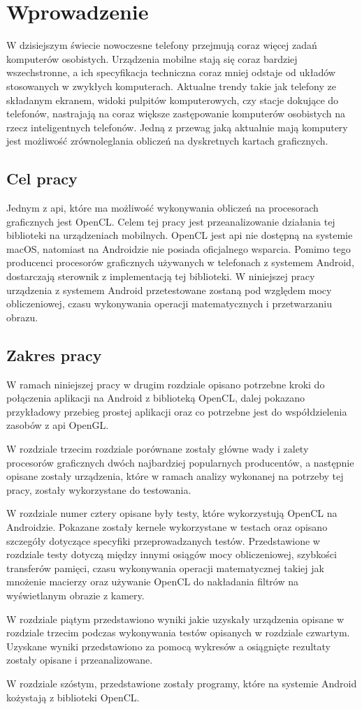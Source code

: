 \section{Wprowadzenie}
W dzisiejszym świecie nowoczesne telefony przejmują coraz więcej zadań komputerów osobistych. Urządzenia mobilne stają się coraz bardziej wszechstronne, a ich specyfikacja techniczna coraz mniej odstaje od układów stosowanych w zwykłych komputerach. Aktualne trendy takie jak telefony ze składanym ekranem, widoki pulpitów komputerowych, czy stacje dokujące do telefonów, nastrajają na coraz większe zastępowanie komputerów osobistych na rzecz inteligentnych telefonów. Jedną z przewag jaką aktualnie mają komputery jest możliwość zrównoleglania obliczeń na dyskretnych kartach graficznych. 

\subsection{Cel pracy}
Jednym z api, które ma możliwość wykonywania obliczeń na procesorach graficznych jest OpenCL. Celem tej pracy jest przeanalizowanie działania tej biblioteki na urządzeniach mobilnych. OpenCL jest api nie dostępną na systemie macOS, natomiast na Androidzie nie posiada oficjalnego wsparcia. Pomimo tego producenci procesorów graficznych używanych w telefonach z systemem Android, dostarczają sterownik z implementacją tej biblioteki. W niniejszej pracy urządzenia z systemem Android przetestowane zostaną pod względem mocy obliczeniowej, czasu wykonywania operacji matematycznych i przetwarzaniu obrazu.

\subsection{Zakres pracy}
W ramach niniejszej pracy w drugim rozdziale opisano potrzebne kroki do połączenia aplikacji na Android z biblioteką OpenCL, dalej pokazano przykładowy przebieg prostej aplikacji oraz co potrzebne jest do współdzielenia zasobów z api OpenGL. 

W rozdziale trzecim rozdziale porównane zostały główne wady i zalety procesorów graficznych dwóch najbardziej popularnych producentów, a następnie opisane zostały urządzenia, które w ramach analizy wykonanej na potrzeby tej pracy, zostały wykorzystane do testowania.

W rozdziale numer cztery opisane były testy, które wykorzystują OpenCL na Androidzie. Pokazane zostały kernele wykorzystane w testach oraz opisano szczegóły dotyczące specyfiki przeprowadzanych testów. Przedstawione w rozdziale testy dotyczą między innymi osiągów mocy obliczeniowej, szybkości transferów pamięci, czasu wykonywania operacji matematycznej takiej jak mnożenie macierzy oraz używanie OpenCL do nakładania filtrów na wyświetlanym obrazie z kamery.

W rozdziale piątym przedstawiono wyniki jakie uzyskały urządzenia opisane w rozdziale trzecim podczas wykonywania testów opisanych w rozdziale czwartym. Uzyskane wyniki przedstawiono za pomocą wykresów a osiągnięte rezultaty zostały opisane i przeanalizowane.

W rozdziale szóstym, przedstawione zostały programy, które na systemie Android kożystają z biblioteki OpenCL.

